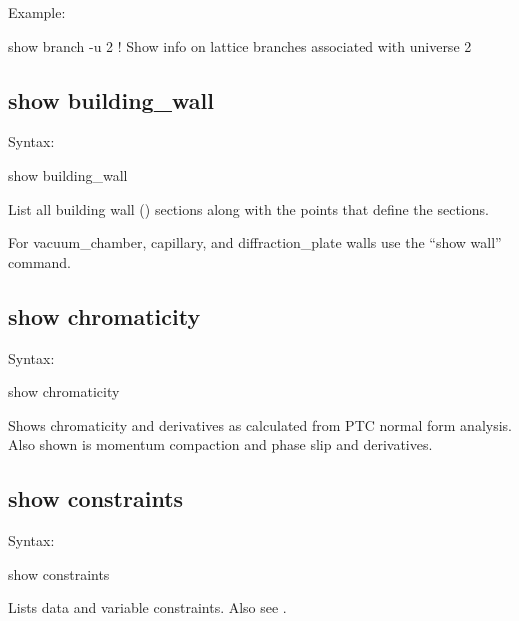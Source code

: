 {{{{{{{{Example:
\begin{example}
  show branch -u 2     ! Show info on lattice branches associated with universe 2
\end{example}


\subsection{show building_wall}
\label{s:show.building}

Syntax:
\begin{example}
  show building_wall
\end{example}

List all building wall () sections along with the points that define
the sections.

For vacuum_chamber, capillary, and diffraction_plate walls use the ``show wall'' command.


\subsection{show chromaticity}
\label{s:show.chrom}

Syntax:
\begin{example}
  show chromaticity
\end{example}

Shows chromaticity and derivatives as calculated from PTC normal form analysis. Also shown
is momentum compaction and phase slip and derivatives.


\subsection{show constraints}
\label{s:show.constraints}

Syntax:
\begin{example}
  show constraints
\end{example}

Lists data and variable constraints. Also see .


}}}}}}}}
